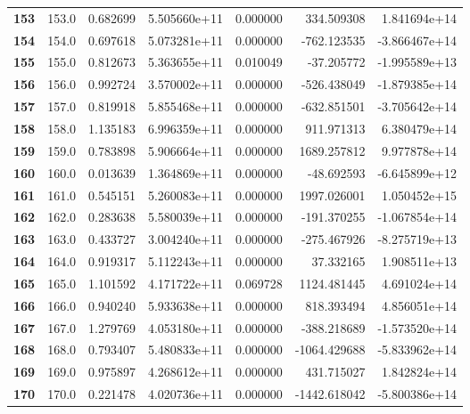 \documentclass{report}[12pt]
\begin{document}
\begin{center}
\begin{tabular}{lrrrrrr}
\textbf{153 } &          153.0 &   0.682699 &  5.505660e+11 &    0.000000 &   334.509308 &  1.841694e+14 \\
\textbf{154 } &          154.0 &   0.697618 &  5.073281e+11 &    0.000000 &  -762.123535 & -3.866467e+14 \\
\textbf{155 } &          155.0 &   0.812673 &  5.363655e+11 &    0.010049 &   -37.205772 & -1.995589e+13 \\
\textbf{156 } &          156.0 &   0.992724 &  3.570002e+11 &    0.000000 &  -526.438049 & -1.879385e+14 \\
\textbf{157 } &          157.0 &   0.819918 &  5.855468e+11 &    0.000000 &  -632.851501 & -3.705642e+14 \\
\textbf{158 } &          158.0 &   1.135183 &  6.996359e+11 &    0.000000 &   911.971313 &  6.380479e+14 \\
\textbf{159 } &          159.0 &   0.783898 &  5.906664e+11 &    0.000000 &  1689.257812 &  9.977878e+14 \\
\textbf{160 } &          160.0 &   0.013639 &  1.364869e+11 &    0.000000 &   -48.692593 & -6.645899e+12 \\
\textbf{161 } &          161.0 &   0.545151 &  5.260083e+11 &    0.000000 &  1997.026001 &  1.050452e+15 \\
\textbf{162 } &          162.0 &   0.283638 &  5.580039e+11 &    0.000000 &  -191.370255 & -1.067854e+14 \\
\textbf{163 } &          163.0 &   0.433727 &  3.004240e+11 &    0.000000 &  -275.467926 & -8.275719e+13 \\
\textbf{164 } &          164.0 &   0.919317 &  5.112243e+11 &    0.000000 &    37.332165 &  1.908511e+13 \\
\textbf{165 } &          165.0 &   1.101592 &  4.171722e+11 &    0.069728 &  1124.481445 &  4.691024e+14 \\
\textbf{166 } &          166.0 &   0.940240 &  5.933638e+11 &    0.000000 &   818.393494 &  4.856051e+14 \\
\textbf{167 } &          167.0 &   1.279769 &  4.053180e+11 &    0.000000 &  -388.218689 & -1.573520e+14 \\
\textbf{168 } &          168.0 &   0.793407 &  5.480833e+11 &    0.000000 & -1064.429688 & -5.833962e+14 \\
\textbf{169 } &          169.0 &   0.975897 &  4.268612e+11 &    0.000000 &   431.715027 &  1.842824e+14 \\
\textbf{170 } &          170.0 &   0.221478 &  4.020736e+11 &    0.000000 & -1442.618042 & -5.800386e+14 \\

\end{tabular}
\end{center}
\end{document}
